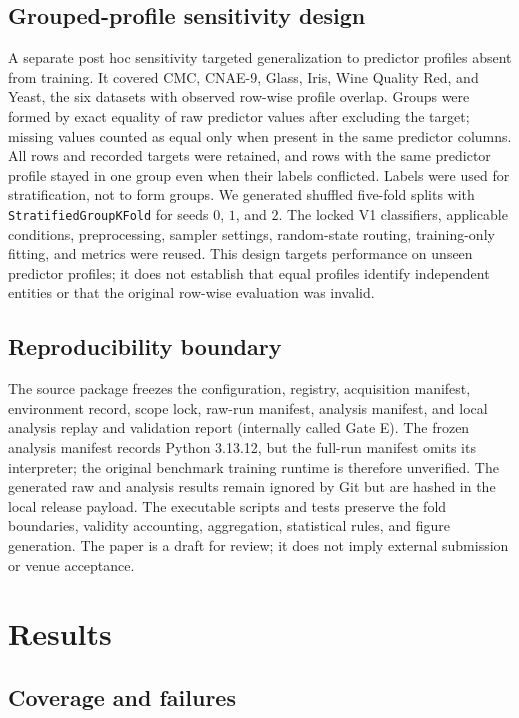 \documentclass[10pt]{article}
\begin{document}
\subsection{Grouped-profile sensitivity design}

A separate post hoc sensitivity targeted generalization to predictor profiles absent from training. It covered CMC, CNAE-9, Glass, Iris, Wine Quality Red, and Yeast, the six datasets with observed row-wise profile overlap. Groups were formed by exact equality of raw predictor values after excluding the target; missing values counted as equal only when present in the same predictor columns. All rows and recorded targets were retained, and rows with the same predictor profile stayed in one group even when their labels conflicted. Labels were used for stratification, not to form groups. We generated shuffled five-fold splits with \texttt{StratifiedGroupKFold} for seeds $0$, $1$, and $2$. The locked V1 classifiers, applicable conditions, preprocessing, sampler settings, random-state routing, training-only fitting, and metrics were reused. This design targets performance on unseen predictor profiles; it does not establish that equal profiles identify independent entities or that the original row-wise evaluation was invalid.

\subsection{Reproducibility boundary}

The source package freezes the configuration, registry, acquisition manifest, environment record, scope lock, raw-run manifest, analysis manifest, and local analysis replay and validation report (internally called Gate E). The frozen analysis manifest records Python 3.13.12, but the full-run manifest omits its interpreter; the original benchmark training runtime is therefore unverified. The generated raw and analysis results remain ignored by Git but are hashed in the local release payload. The executable scripts and tests preserve the fold boundaries, validity accounting, aggregation, statistical rules, and figure generation. The paper is a draft for review; it does not imply external submission or venue acceptance.

\section{Results}
\label{sec:results}

\subsection{Coverage and failures}
\end{document}
